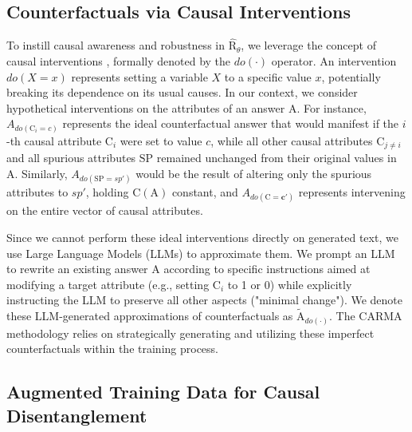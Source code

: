 \subsection{Counterfactuals via Causal Interventions}
\label{subsec:interventions}

To instill causal awareness and robustness in $\hat{\mathrm{R}}_\theta$, we leverage the concept of causal interventions \citep{pearl2009causality}, formally denoted by the $do(\cdot)$ operator. An intervention $do(X=x)$ represents setting a variable $X$ to a specific value $x$, potentially breaking its dependence on its usual causes. In our context, we consider hypothetical interventions on the attributes of an answer $\mathrm{A}$. For instance, $A_{do(\mathrm{C}_i=c)}$ represents the ideal counterfactual answer that would manifest if the $i$-th causal attribute $\mathrm{C}_i$ were set to value $c$, while all other causal attributes $\mathrm{C}_{j \neq i}$ and all spurious attributes $\mathrm{SP}$ remained unchanged from their original values in $\mathrm{A}$. Similarly, $A_{do(\mathrm{SP}=sp')}$ would be the result of altering only the spurious attributes to $sp'$, holding $\mathrm{C}(\mathrm{A})$ constant, and $A_{do(\mathrm{C}=\mathbf{c}')}$ represents intervening on the entire vector of causal attributes.

Since we cannot perform these ideal interventions directly on generated text, we use Large Language Models (LLMs) to approximate them. We prompt an LLM to rewrite an existing answer $\mathrm{A}$ according to specific instructions aimed at modifying a target attribute (e.g., setting $\mathrm{C}_i$ to 1 or 0) while explicitly instructing the LLM to preserve all other aspects ("minimal change"). We denote these LLM-generated approximations of counterfactuals as $\tilde{\mathrm{A}}_{do(\cdot)}$. The CARMA methodology relies on strategically generating and utilizing these imperfect counterfactuals within the training process.

\subsection{Augmented Training Data for Causal Disentanglement}
\label{subsec:data_augmentation}

